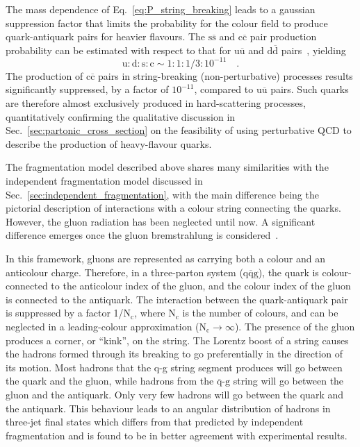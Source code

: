 The mass dependence of Eq.~\ref{eq:P_string_breaking} leads to a gaussian suppression factor that limits the probability for the colour field to produce quark-antiquark pairs for heavier flavours. The $\mathrm{s\overline{s}}$ and $\mathrm{c\overline{c}}$ pair production probability can be estimated with respect to that for $\mathrm{u\overline{u}}$ and $\mathrm{d\overline{d}}$ pairs~\cite{Ferreres-Sole:2018vgo}, yielding
\begin{equation*}
    \mathrm{u : d : s : c} \sim 1 : 1 : 1/3 : 10^{-11}\quad .
\end{equation*}
The production of $\mathrm{c\overline{c}}$ pairs in string-breaking (non-perturbative) processes results significantly suppressed, by a factor of $10^{-11}$, compared to $\mathrm{u\overline{u}}$ pairs. Such quarks are therefore almost exclusively produced in hard-scattering processes, quantitatively confirming the qualitative discussion in Sec.~\ref{sec:partonic_cross_section} on the feasibility of using perturbative QCD to describe the production of heavy-flavour quarks.

The fragmentation model described above shares many similarities with the independent fragmentation model discussed in Sec.~\ref{sec:independent_fragmentation}, with the main difference being the pictorial description of interactions with a colour string connecting the quarks. However, the gluon radiation has been neglected until now. A significant difference emerges once the gluon bremstrahlung is considered~\cite{Sjostrand:1984ic}. 

In this framework, gluons are represented as carrying both a colour and an anticolour charge. Therefore, in a three-parton system ($\mathrm{q\overline{q}g}$), the quark is colour-connected to the anticolour index of the gluon, and the colour index of the gluon is connected to the antiquark. The interaction between the quark-antiquark pair is suppressed by a factor 1/$\mathrm{N_c}$, where $\mathrm{N_c}$ is the number of colours, and can be neglected in a leading-colour approximation ($\mathrm{N_c} \rightarrow\infty$). The presence of the gluon produces a corner, or “kink”, on the string. The Lorentz boost of a string causes the hadrons formed through its breaking to go preferentially in the direction of its motion. Most hadrons that the q-g string segment produces will go between the quark and the gluon, while hadrons from the $\mathrm{\overline{q}\text{-}g}$ string will go between the gluon and the antiquark. Only very few hadrons will go between the quark and the antiquark. This behaviour leads to an angular distribution of hadrons in \ee three-jet final states which differs from that predicted by independent fragmentation and is found to be in better agreement with experimental results. 

